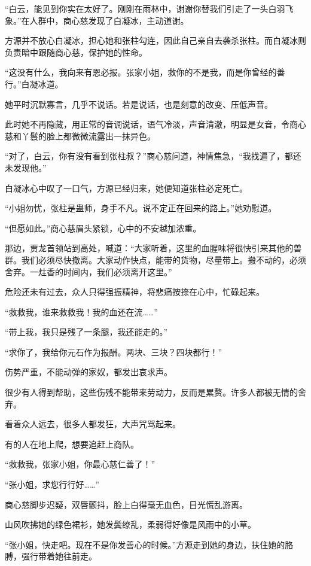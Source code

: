 \begin{this_body}
“白云，能见到你实在太好了。刚刚在雨林中，谢谢你替我们引走了一头白羽飞象。”在人群中，商心慈发现了白凝冰，主动道谢。

方源并不放心白凝冰，担心她和张柱勾连，因此自己亲自去袭杀张柱。而白凝冰则负责暗中跟随商心慈，保护她的性命。

“这没有什么，我向来有恩必报。张家小姐，救你的不是我，而是你曾经的善行。”白凝冰道。

她平时沉默寡言，几乎不说话。若是说话，也是刻意的改变、压低声音。

此时她不再隐藏，用正常的音调说话，语气冷淡，声音清澈，明显是女音，令商心慈和丫鬟的脸上都微微流露出一抹异色。

“对了，白云，你有没有看到张柱叔？”商心慈问道，神情焦急，“我找遍了，都还未发现他。”

白凝冰心中叹了一口气，方源已经归来，她便知道张柱必定死亡。

“小姐勿忧，张柱是蛊师，身手不凡。说不定正在回来的路上。”她劝慰道。

“但愿如此。”商心慈眉头紧锁，心中的不安越加浓重。

那边，贾龙首领站到高处，喊道：“大家听着，这里的血腥味将很快引来其他的兽群。我们必须尽快撤离。大家动作快点，能带的货物，尽量带上。搬不动的，必须舍弃。一炷香的时间内，我们必须离开这里。”

危险还未有过去，众人只得强振精神，将悲痛按捺在心中，忙碌起来。

“救救我，谁来救救我！我的血还在流……”

“带上我，我只是残了一条腿，我还能走的。”

“求你了，我给你元石作为报酬。两块、三块？四块都行！”

伤势严重，不能动弹的家奴，都发出哀求声。

很少有人得到帮助，这些伤残不能带来劳动力，反而是累赘。许多人都被无情的舍弃。

看着众人远去，很多人都发狂，大声咒骂起来。

有的人在地上爬，想要追赶上商队。

“救救我，张家小姐，你最心慈仁善了！”

“张小姐，求您行行好……”

商心慈脚步迟疑，双唇颤抖，脸上白得毫无血色，目光慌乱游离。

山风吹拂她的绿色裙衫，她发鬓缭乱，柔弱得好像是风雨中的小草。

“张小姐，快走吧。现在不是你发善心的时候。”方源走到她的身边，扶住她的胳膊，强行带着她往前走。


\end{this_body}
